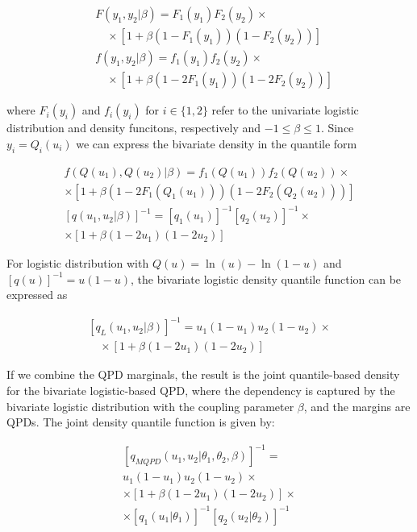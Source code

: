 \documentclass[
  fleqn,
  deca,
  blindrev
]{informs4}
\begin{document}
\[
\begin{aligned}
&F(y_1,y_2\vert\beta)=F_1(y_1)F_2(y_2)\times\\
&\quad \times [1+\beta(1-F_1(y_1))(1-F_2(y_2))]\\
&f(y_1,y_2\vert\beta)=f_1(y_1)f_2(y_2)\times\\
&\quad \times [1+\beta(1-2F_1(y_1))(1-2F_2(y_2))]
\end{aligned}
\]

where \(F_i(y_i)\) and \(f_i(y_i)\) for \(i\in\{1,2\}\) refer to the
univariate logistic distribution and density funcitons, respectively and
\(-1\leq\beta\leq1\). Since \(y_i=Q_i(u_i)\) we can express the
bivariate density in the quantile form

\[
\begin{gathered}
f(Q(u_1),Q(u_2)\vert\beta)=f_1(Q(u_1))f_2(Q(u_2))\times\\
\times [1+\beta(1-2F_1(Q_1(u_1)))(1-2F_2(Q_2(u_2)))]\\
\left[q(u_1,u_2\vert\beta)\right]^{-1}=[q_1(u_1)]^{-1}[q_2(u_2)]^{-1} \times\\
\times \left[1+\beta (1-2u_1)(1-2u_2)\right]
\end{gathered}
\]

For logistic distribution with \(Q(u)=\ln(u)-\ln(1-u)\) and
\([q(u)]^{-1}=u(1-u)\), the bivariate logistic density quantile function
can be expressed as

\[
\begin{gathered}
\left[q_L(u_1,u_2\vert\beta)\right]^{-1}=u_1(1-u_1)u_2(1-u_2)\times\\
\quad\times \left[1+\beta (1-2u_1)(1-2u_2)\right]
\end{gathered}
\]

If we combine the QPD marginals, the result is the joint quantile-based
density for the bivariate logistic-based QPD, where the dependency is
captured by the bivariate logistic distribution with the coupling
parameter \(\beta\), and the margins are QPDs. The joint density
quantile function is given by:

\[
\begin{gathered}
\left[q_{MQPD}(u_1,u_2\vert\theta_1,\theta_2, \beta)\right]^{-1}=\\
u_1(1-u_1)u_2(1-u_2)\times\\
\times\left[1+\beta (1-2u_1)(1-2u_2)\right]\times\\
\times [q_1(u_1\vert\theta_1)]^{-1}[q_2(u_2\vert\theta_2)]^{-1}
\end{gathered}
\]
\end{document}

